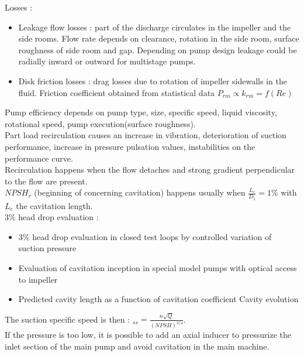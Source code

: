 \documentclass[../main.tex]{subfiles}
\begin{document}
Losses : \begin{itemize}
    \item Leakage flow losses : part of the discharge circulates in the impeller and the side rooms. Flow rate depends on clearance, rotation in the side room, surface roughness of side room and gap. Depending on pump design leakage could be radially inward or outward for multistage pumps.
    \item Disk friction losses : drag losses due to rotation of impeller sidewalls in the fluid. Friction coefficient obtained from statistical data $P_{rm} \propto k_{rm} = f(Re)$
\end{itemize}
Pump efficiency depends on pump type, size, specific speed, liquid viscosity, rotational speed, pump execution(surface roughness).\\

Part load recirculation causes an increase in vibration, deterioration of suction performance, increase in pressure pulsation values, instabilities on the performance curve.\\
\warning Recirculation happens when the flow detaches and strong gradient perpendicular to the flow are present.\\

$NPSH_r$ (beginning of concerning cavitation) happens usually when $\frac{L_c}{D_1} = 1\%$ with $L_c$ the cavitation length.\\
$3\%$ head drop evaluation : \begin{itemize}
    \item $3\%$ head drop evaluation in closed test loops by controlled variation of suction pressure
    \item Evaluation of cavitation inception in special model pumps with optical access to impeller
    \item Predicted cavity length as a function of cavitation coefficient Cavity evolution
\end{itemize}

The suction specific speed is then : $_{ss} = \frac{n \sqrt{Q}}{(NPSH)^{3/4}}$.\\
If the pressure is too low, it is possible to add an axial inducer to pressurize the inlet section of the main pump and avoid cavitation in the main machine.\\
\end{document}

